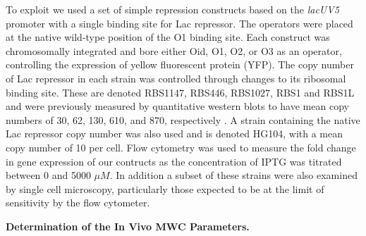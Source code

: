 \pagebreak


To exploit \eref[eq7] we used a set of simple repression constructs based on the \textit{lacUV5} promoter with a single binding site for Lac repressor. The operators were placed at the native wild-type position of the O1 binding site. Each construct was chromosomally integrated and bore either Oid, O1, O2, or O3 as an operator, controlling the expression of yellow fluorescent protein (YFP). The copy number of Lac repressor in each strain was controlled through changes to its ribosomal binding site. These are denoted RBS1147, RBS446, RBS1027, RBS1 and RBS1L and were previously measured by quantitative western blots to have mean copy numbers of 30, 62, 130, 610, and 870, respectively \cite{Garcia2011}. A strain containing the native Lac repressor copy number was also used and is denoted HG104, with a mean copy number of 10 per cell. Flow cytometry was used to measure the fold change in gene expression of our contructs as the concentration of IPTG was titrated between 0 and 5000 $\mu M$. In addition a subset of these strains were also examined by single cell microscopy, particularly those expected to be at the limit of sensitivity by the flow cytometer. 

\noindent \textbf{Determination of the In Vivo MWC Parameters.}

